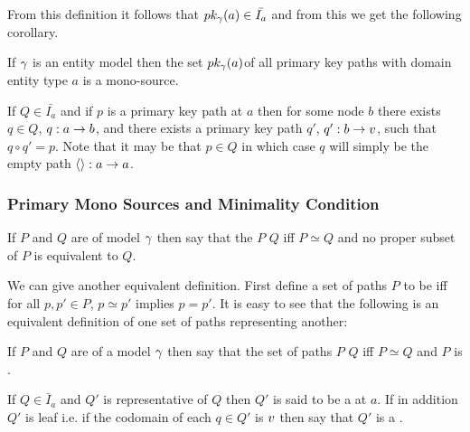 From this definition it follows that $pk_{\gamma}(a) \in \bar{I_a}$ and from this we get the following corollary.

\begin{corollary}
If $\gamma$ is an entity model then the set $pk_{\gamma}(a)$of all primary key paths 
with domain entity type $a$ is a mono-source.
\end{corollary}

\begin{observation}
If $Q \in \bar{I_a}$ and if $p$ is a primary key path at $a$ then for some node $b$ there exists $q \in Q$, $q: a \rightarrow b$, and there exists 
a primary key path $q'$, $q': b \rightarrow v$,  such that $q \circ q' = p$. 
Note that it may be that $p \in Q$ in which case $q$ will simply be the empty path $\langle\rangle:a \rightarrow a$.
\end{observation}

\subsubsection{Primary Mono Sources and Minimality Condition}

\begin{definition}
If $P$ and $Q$ are  of model $\gamma$ then say that the  $P$ 
 $Q$ 
iff $P \simeq Q$ and no proper subset of $P$ is equivalent to $Q$. 
\end{definition}

We can give another equivalent definition. First define
a set of paths $P$ to be  iff for all $p,p' \in P$,
$p \simeq p'$ implies $p=p'$. It is easy to see that the following is an equivalent definition of one set of paths representing another:

\begin{definition}
If $P$ and $Q$ are   of a model $\gamma$ then 
say that the set of paths $P$  $Q$ iff $P \simeq Q$ and $P$ is . 
\end{definition}

\begin{definition}
If $Q \in \bar{I}_a$ and $Q'$ is representative of $Q$ then $Q'$ is said to be
a  at $a$. If in addition $Q'$ is leaf i.e. if the codomain of each $q \in Q'$ is $v$ then say that $Q'$ is a 
.
\end{definition}

